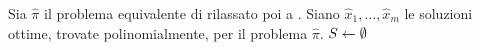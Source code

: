 
Sia $\hat\pi$ il problema equivalente di \IntegerLinearProgramming rilassato poi a \LinearProgramming.\;
Siano $\hat x_1,\dots,\hat x_m$ le soluzioni ottime, trovate polinomialmente, per il problema $\hat\pi$.\;
$S\leftarrow\emptyset$\;
\;
